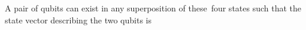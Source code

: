 \documentclass[preview]{standalone}
\begin{document}
\begin{center}
A pair of qubits can exist in any superposition of these\
                four states such that the state vector describing the two qubits is
\end{center}
\end{document}

